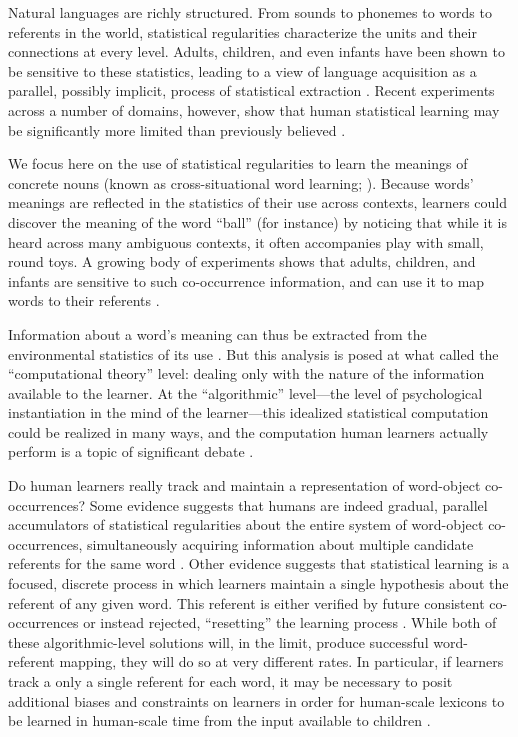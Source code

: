 \documentclass[authoryear,review]{elsarticle}
\begin{document}
Natural languages are richly structured. From sounds to phonemes to words to referents in the world, statistical regularities characterize the units and their connections at every level. Adults, children, and even infants have been shown to be sensitive to these statistics, leading to a view of language acquisition as a parallel, possibly implicit, process of statistical extraction \citep{Saffran1996a, Gomez2000}. Recent experiments across a number of domains, however, show that human statistical learning may be significantly more limited than previously believed \citep{Johnson2010c, Yurovsky2012c, Trueswell2013}.

We focus here on the use of statistical regularities to learn the meanings of concrete nouns (known as cross-situational word learning; \citealt{Pinker1989, Siskind1996, Yu2007}). Because words' meanings are reflected in the statistics of their use across contexts, learners could discover the meaning of the word ``ball'' (for instance) by noticing that while it is heard across many ambiguous contexts, it often accompanies play with small, round toys. A growing body of experiments shows that adults, children, and infants are sensitive to such co-occurrence information, and can use it to map words to their referents \citep{Yu2007, Smith2008, Vlach2013, Suanda2014}.

Information about a word's meaning can thus be extracted from the environmental statistics of its use \citep{Siskind1996,Frank2009a}. But this analysis is posed at what \citet{Marr1982} called the ``computational theory'' level: dealing only with the nature of the information available to the learner. At the ``algorithmic'' level---the level of psychological instantiation in the mind of the learner---this idealized statistical computation could be realized in many ways, and the computation human learners actually perform is a topic of significant debate \cite[see e.g.,][]{Yu2012b}. 

Do human learners really track and maintain a representation of word-object co-occurrences? Some evidence suggests that humans are indeed gradual, parallel accumulators of statistical regularities about the entire system of word-object co-occurrences, simultaneously acquiring information about multiple candidate referents for the same word \citep{Vouloumanos2008, McMurray2012, Yurovsky2014}. Other evidence suggests that statistical learning is a focused, discrete process in which learners maintain a single hypothesis about the referent of any given word. This referent is either verified by future consistent co-occurrences or instead rejected, ``resetting'' the learning process \citep{Medina2011, Trueswell2013}. While both of these algorithmic-level solutions will, in the limit, produce successful word-referent mapping, they will do so at very different rates. In particular, if learners track a only a single referent for each word, it may be necessary to posit additional biases and constraints on learners in order for human-scale lexicons to be learned in human-scale time from the input available to children \citep{Blythe2010,Reisenauer2013}.
\end{document}
